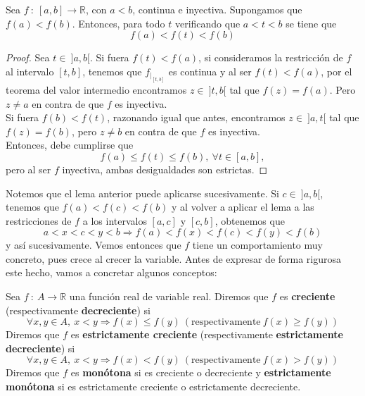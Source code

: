 \begin{lema}\label{lema:12.7.1}
    Sea $f ~:~ [a,b] \longrightarrow \mathbb{R}$, con $a < b$, continua e inyectiva. Supongamos que $f(a) < f(b)$.
    Entonces, para todo $t$ verificando que $a < t < b$ se tiene que
    \begin{equation*}
        f(a) < f(t) < f(b)
    \end{equation*}
\end{lema}
\begin{proof}
    Sea $t \in ~ ]a,b[$. Si fuera $f(t) < f(a)$, si consideramos la restricción de $f$ al intervalo $[t,b]$, tenemos que $f_{|_{[t,b]}}$ es continua y al ser $f(t) < f(a)$, por el teorema del valor intermedio encontramos $z \in ~ ]t,b[$ tal que $f(z) = f(a)$. Pero $z \neq a$ en contra de que $f$ es inyectiva.\\
    
    Si fuera $f(b) < f(t)$, razonando igual que antes, encontramos $z \in ~ ]a,t[$ tal que $f(z) = f(b)$, pero $z \neq b$ en contra de que $f$ es inyectiva.\\
    
    Entonces, debe cumplirse que
    \begin{equation*}
        f(a) \leq f(t) \leq f(b), ~ \forall t \in [a,b],
    \end{equation*}
    pero al ser $f$ inyectiva, ambas desigualdades son estrictas.
\end{proof}

Notemos que el lema anterior puede aplicarse sucesivamente. Si $c \in ~]a,b[$, tenemos que $f(a) < f(c) < f(b)$ y al volver a aplicar el lema a las restricciones de $f$ a los intervalos $[a,c]$ y $[c,b]$, obtenemos que
\begin{equation*}
    a < x < c < y < b \Longrightarrow f(a) < f(x) < f(c) < f(y) < f(b)
\end{equation*}
y así sucesivamente. Vemos entonces que $f$ tiene un comportamiento muy concreto, pues crece al crecer la variable.
Antes de expresar de forma rigurosa este hecho, vamos a concretar algunos conceptos:

\begin{definicion}
    Sea $f ~:~ A \longrightarrow \mathbb{R}$ una función real de variable real.
    Diremos que $f$ es \textbf{creciente} (respectivamente \textbf{decreciente}) si
    \begin{equation*}
        \forall x,y \in A, ~ x < y \Longrightarrow f(x) \leq f(y) ~ (\text{respectivamente} ~ f(x) \geq f(y))
    \end{equation*}
    Diremos que $f$ es \textbf{estrictamente creciente} (respectivamente \textbf{estrictamente decreciente}) si
    \begin{equation*}
        \forall x,y \in A, ~ x < y \Longrightarrow f(x) < f(y) ~ (\text{respectivamente} ~ f(x) > f(y))
    \end{equation*}
    Diremos que $f$ es \textbf{monótona} si es creciente o decreciente y \textbf{estrictamente monótona}
    si es estrictamente creciente o estrictamente decreciente.
\end{definicion}

